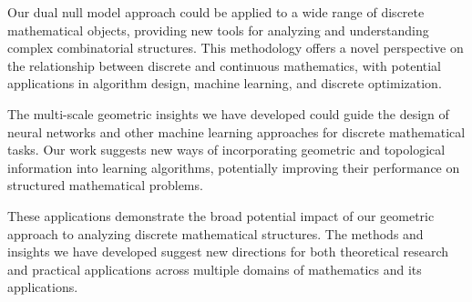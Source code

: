 Our dual null model approach could be applied to a wide range of discrete mathematical objects, providing new tools for analyzing and understanding complex combinatorial structures. This methodology offers a novel perspective on the relationship between discrete and continuous mathematics, with potential applications in algorithm design, machine learning, and discrete optimization.

The multi-scale geometric insights we have developed could guide the design of neural networks and other machine learning approaches for discrete mathematical tasks. Our work suggests new ways of incorporating geometric and topological information into learning algorithms, potentially improving their performance on structured mathematical problems.

These applications demonstrate the broad potential impact of our geometric approach to analyzing discrete mathematical structures. The methods and insights we have developed suggest new directions for both theoretical research and practical applications across multiple domains of mathematics and its applications. 